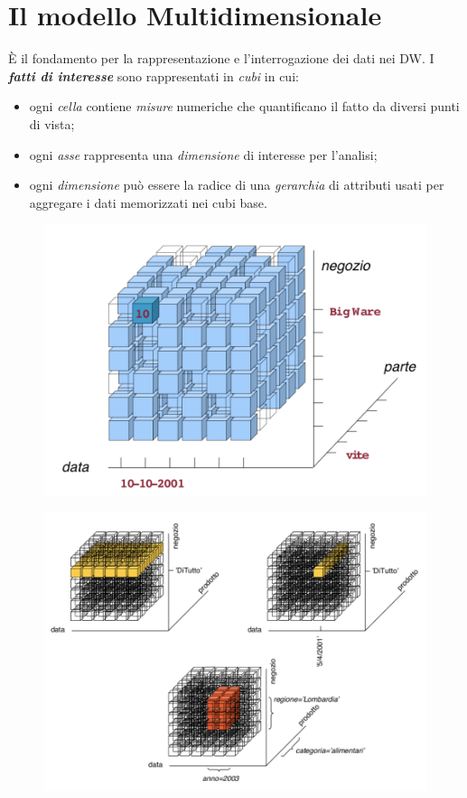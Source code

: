 \documentclass[a4paper, notitlepage, 9pt]{extreport}
\begin{document}
\section*{Il modello Multidimensionale}
\MakeUppercase{è} il fondamento per la rappresentazione e l'interrogazione dei dati nei DW. I \textbf{\textit{fatti di interesse}} sono rappresentati in \textit{cubi} in cui:
\begin{itemize}
	\item ogni \textit{cella} contiene \textit{misure} numeriche che quantificano il fatto da diversi punti di vista;
	\item ogni \textit{asse} rappresenta una \textit{dimensione} di interesse per l’analisi;
	\item ogni \textit{dimensione} può essere la radice di una \textit{gerarchia} di attributi usati per aggregare i dati memorizzati nei cubi base.
\end{itemize}
\begin{multicols}{2}
	\begin{figure}[H]
		\centering
		\includegraphics[scale=0.35]{CuboVendite}
	\end{figure}
	\columnbreak
	\begin{figure}[H]
		\centering
		\includegraphics[scale=0.38]{Slicing}
	\end{figure}
\end{multicols}
\end{document}
